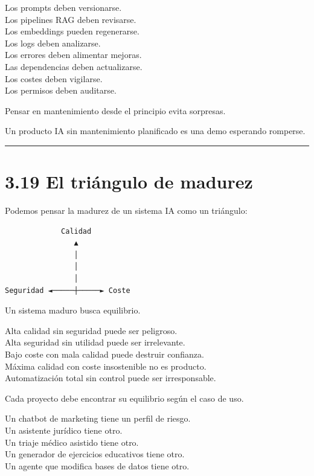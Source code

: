 Los prompts deben versionarse.\\
Los pipelines RAG deben revisarse.\\
Los embeddings pueden regenerarse.\\
Los logs deben analizarse.\\
Los errores deben alimentar mejoras.\\
Las dependencias deben actualizarse.\\
Los costes deben vigilarse.\\
Los permisos deben auditarse.

Pensar en mantenimiento desde el principio evita sorpresas.

Un producto IA sin mantenimiento planificado es una demo esperando
romperse.

\begin{center}\rule{0.5\linewidth}{0.5pt}\end{center}

\section{3.19 El triángulo de madurez}\label{el-triuxe1ngulo-de-madurez}

Podemos pensar la madurez de un sistema IA como un triángulo:

\begin{lstlisting}
             Calidad
                ▲
                │
                │
                │
Seguridad ◄─────┼─────► Coste
\end{lstlisting}

Un sistema maduro busca equilibrio.

Alta calidad sin seguridad puede ser peligroso.\\
Alta seguridad sin utilidad puede ser irrelevante.\\
Bajo coste con mala calidad puede destruir confianza.\\
Máxima calidad con coste insostenible no es producto.\\
Automatización total sin control puede ser irresponsable.

Cada proyecto debe encontrar su equilibrio según el caso de uso.

Un chatbot de marketing tiene un perfil de riesgo.\\
Un asistente jurídico tiene otro.\\
Un triaje médico asistido tiene otro.\\
Un generador de ejercicios educativos tiene otro.\\
Un agente que modifica bases de datos tiene otro.

